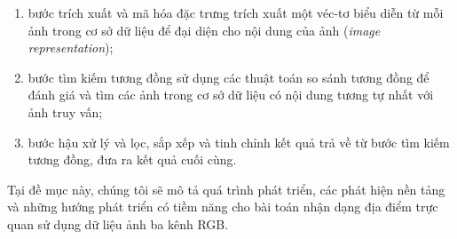 \begin{enumerate}
    \item bước trích xuất và mã hóa đặc trưng trích xuất một véc-tơ biểu diễn từ mỗi ảnh trong cơ sở dữ liệu để đại diện cho nội dung của ảnh (\textit{image representation});
    \item bước tìm kiếm tương đồng sử dụng các thuật toán so sánh tương đồng để đánh giá và tìm các ảnh trong cơ sở dữ liệu có nội dung tương tự nhất với ảnh truy vấn;
    \item bước hậu xử lý và lọc, sắp xếp và tinh chỉnh kết quả trả về từ bước tìm kiếm tương đồng, đưa ra kết quả cuối cùng.
\end{enumerate}

Tại đề mục này, chúng tôi sẽ mô tả quá trình phát triển, các phát hiện nền tảng và những hướng phát triển có tiềm năng cho bài toán nhận dạng địa điểm trực quan sử dụng dữ liệu ảnh ba kênh RGB.










